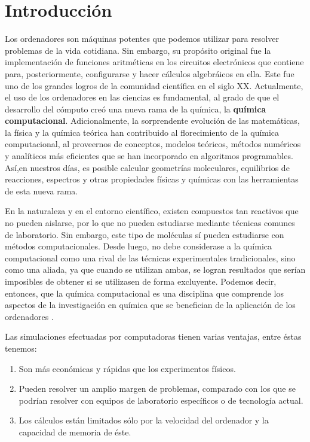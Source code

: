 \documentclass[12pt]{article}
\begin{document}
\section*{Introducción}
Los ordenadores son máquinas potentes que podemos utilizar para resolver problemas de la vida
cotidiana. Sin embargo, su propósito original fue la implementación de funciones aritméticas
en los circuitos electrónicos que contiene para, posteriormente, configurarse y hacer cálculos
algebráicos en ella. Este fue uno de los grandes logros de la comunidad científica en el siglo XX.
Actualmente, el uso de los ordenadores en las ciencias es fundamental, al grado de que el desarrollo
del cómputo creó una nueva rama de la química, la \textbf{química computacional}.
Adicionalmente, la sorprendente evolución de las matemáticas, la física y la química teórica han contribuido al florecimiento de la química computacional, al proveernos de conceptos, modelos
teóricos, métodos numéricos y analíticos más eficientes que se han incorporado en algoritmos
programables. Así,en nuestros días, es posible calcular geometrías moleculares, equilibrios de
reacciones, espectros y otras propiedades físicas y químicas con las herramientas de esta nueva
rama. 

En la naturaleza y en el entorno científico, existen compuestos tan reactivos que no pueden
aislarse, por lo que no pueden estudiarse mediante técnicas comunes de laboratorio. Sin embargo, este tipo de moléculas sí pueden estudiarse con métodos computacionales. Desde luego, no debe considerase a la química computacional como una rival de las técnicas experimentales tradicionales, sino como
una aliada, ya que cuando se utilizan ambas, se logran resultados que serían imposibles de obtener si se utilizasen de forma excluyente. Podemos decir, entonces, que la química computacional es una disciplina que comprende los aspectos de la investigación en química que se benefician de la aplicación de los ordenadores \cite{Cuevas2003}.

Las simulaciones efectuadas por computadoras tienen varias ventajas, entre éstas tenemos:
\begin{enumerate}
\item Son más económicas y rápidas que los experimentos físicos.
\item Pueden resolver un amplio margen de problemas, comparado con los que se podrían resolver con equipos de laboratorio específicos o de tecnología actual. 
\item Los cálculos están limitados sólo por la velocidad del ordenador y la capacidad de memoria de éste.
\end{enumerate}
\end{document}
